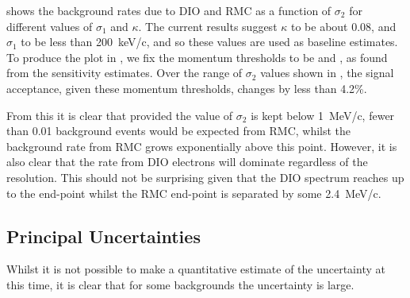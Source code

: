  shows the background rates due to \ac{DIO} and \ac{RMC} as a function of $\sigma_2$ for different values of $\sigma_1$ and $\kappa$.
The current \phaseI results suggest $\kappa$ to be about 0.08, and $\sigma_1$ to be less than 200~keV/c, and so these values are used as baseline estimates.
To produce the plot in , we fix the momentum thresholds to be \VarMomThreshold and \VarMomThresholdHigh, as found from the sensitivity estimates.
Over the range of $\sigma_2$ values shown in , the signal acceptance, given these momentum thresholds, changes by less than 4.2\%.
  
From this it is clear that provided the value of $\sigma_2$ is kept below 1~MeV/c, fewer than 0.01 background events would be expected from \ac{RMC}, whilst the background rate from RMC grows exponentially above this point.
However, it is also clear that the rate from DIO electrons will dominate regardless of the resolution.
This should not be surprising given that the \ac{DIO} spectrum reaches up to the \mueconv end-point whilst the RMC end-point is separated by some 2.4~MeV/c.

\subsection{Principal Uncertainties}
Whilst it is not possible to make a quantitative estimate of the uncertainty at this time, it is clear that for some backgrounds the uncertainty is large.

